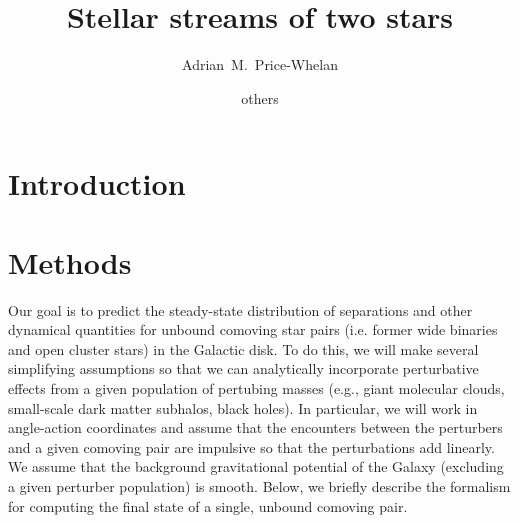 \documentclass[modern, letterpaper]{aastex61}
\begin{document}
\sloppy\sloppypar\raggedbottom\frenchspacing %

\title{Stellar streams of two stars}

\author{Adrian~M.~Price-Whelan}

\author{others}



\begin{abstract}
\end{abstract}

\keywords{
}

\section{Introduction}\label{sec:introduction}


\section{Methods} \label{sec:methods}

Our goal is to predict the steady-state distribution of separations and other
dynamical quantities for unbound comoving star pairs (i.e. former wide binaries
and open cluster stars) in the Galactic disk.
To do this, we will make several simplifying assumptions so that we can
analytically incorporate perturbative effects from a given population of
pertubing masses (e.g., giant molecular clouds, small-scale dark matter
subhalos, black holes).
In particular, we will work in angle-action coordinates and assume that the
encounters between the perturbers and a given comoving pair are impulsive so
that the perturbations add linearly.
We assume that the background gravitational potential of the Galaxy (excluding a
given perturber population) is smooth.
Below, we briefly describe the formalism for computing the final state of a
single, unbound comoving pair.
\end{document}
